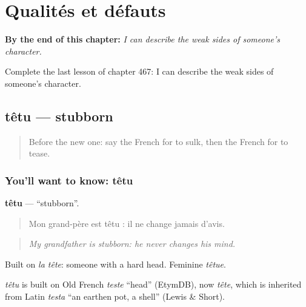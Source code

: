 
\chapter{Qualités et défauts}
\label{ch:fr-qualites-et-defauts}

\begin{chapteropening}
\textbf{By the end of this chapter:} \emph{I can describe the weak sides of someone's character.}

Complete the last lesson of chapter 467: I can describe the weak sides of someone's character.
\end{chapteropening}

\section[têtu]{têtu — stubborn}

\label{lesson:FR-C467-tetu}



\begin{quote}
Before the new one: say the French for to sulk, then the French for to tease.
\end{quote}

\subsection*{You'll want to know: têtu}
\textbf{têtu} — \textquotedblleft{}stubborn\textquotedblright{}.

\begin{quote}
Mon grand-père est têtu : il ne change jamais d'avis.
\end{quote}

\begin{quote}
\emph{My grandfather is stubborn: he never changes his mind.}
\end{quote}

Built on \emph{la tête}: someone with a hard head. Feminine \emph{têtue}.

\begin{cousinweb}
\emph{têtu} is built on Old French \emph{teste} \textquotedblleft{}head\textquotedblright{} (EtymDB), now \emph{tête}, which is inherited from Latin \emph{testa} \textquotedblleft{}an earthen pot, a shell\textquotedblright{} (Lewis \& Short).
\end{cousinweb}


